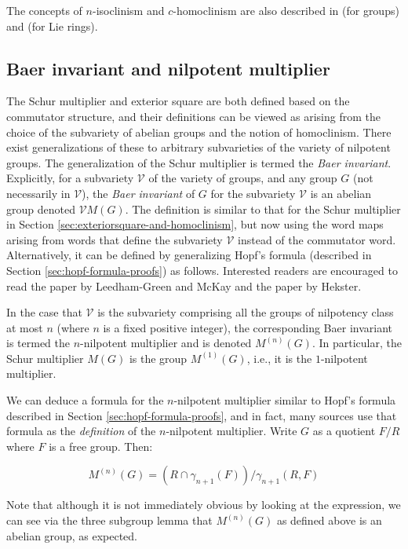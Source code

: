 The concepts of $n$-isoclinism and $c$-homoclinism are also
described in \cite{Hekster} (for groups) and \cite{Moghaddametal} (for
Lie rings).

\subsection{Baer invariant and nilpotent multiplier}

The Schur multiplier and exterior square are both defined based on the
commutator structure, and their definitions can be viewed as arising
from the choice of the subvariety of abelian groups and the notion of
homoclinism. There exist generalizations of these to arbitrary
subvarieties of the variety of nilpotent groups. The generalization of
the Schur multiplier is termed the {\em Baer invariant}. Explicitly,
for a subvariety $\mathcal{V}$ of the variety of groups, and any group
$G$ (not necessarily in $\mathcal{V}$), the {\em Baer invariant} of
$G$ for the subvariety $\mathcal{V}$ is an abelian group denoted
$\mathcal{V}M(G)$. The definition is similar to that for the Schur
multiplier in Section \ref{sec:exteriorsquare-and-homoclinism}, but
now using the word maps arising from words that define the subvariety
$\mathcal{V}$ instead of the commutator word. Alternatively, it can be
defined by generalizing Hopf's formula (described in Section
\ref{sec:hopf-formula-proofs}) as follows. Interested readers are encouraged
to read the paper \cite{Baerinvariantsandisolosigms} by Leedham-Green
and McKay and the paper \cite{Hekster} by Hekster.

In the case that $\mathcal{V}$ is the subvariety comprising all the
groups of nilpotency class at most $n$ (where $n$ is a fixed positive
integer), the corresponding Baer invariant is termed the $n$-nilpotent
multiplier and is denoted $M^{(n)}(G)$. In particular, the Schur
multiplier $M(G)$ is the group $M^{(1)}(G)$, i.e., it is the
$1$-nilpotent multiplier.

We can deduce a formula for the $n$-nilpotent multiplier similar to
Hopf's formula described in Section \ref{sec:hopf-formula-proofs}, and in
fact, many sources use that formula as the {\em definition} of the
$n$-nilpotent multiplier. Write $G$ as a quotient $F/R$ where $F$ is a
free group. Then:

$$M^{(n)}(G) = (R \cap \gamma_{n +1}(F))/\gamma_{n+1}(R,F)$$

Note that although it is not immediately obvious by looking at the
expression, we can see via the three subgroup lemma that $M^{(n)}(G)$
as defined above is an abelian group, as expected.


